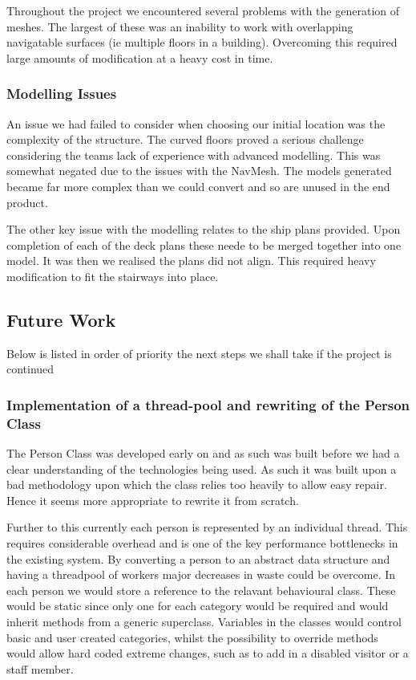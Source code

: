 Throughout the project we encountered several problems with the generation
of meshes. The largest of these was an inability to work with overlapping
navigatable surfaces (ie multiple floors in a building). Overcoming
this required large amounts of modification at a heavy cost in time.


\subsubsection*{Modelling Issues}

An issue we had failed to consider when choosing our initial location
was the complexity of the structure. The curved floors proved a serious
challenge considering the teams lack of experience with advanced modelling.
This was somewhat negated due to the issues with the NavMesh. The
models generated became far more complex than we could convert and
so are unused in the end product.

The other key issue with the modelling relates to the ship plans provided.
Upon completion of each of the deck plans these neede to be merged
together into one model. It was then we realised the plans did not
align. This required heavy modification to fit the stairways into
place.


\subsection{Future Work}

Below is listed in order of priority the next steps we shall take
if the project is continued


\subsubsection*{Implementation of a thread-pool and rewriting of the Person Class}

The Person Class was developed early on and as such was built before
we had a clear understanding of the technologies being used. As such
it was built upon a bad methodology upon which the class relies too
heavily to allow easy repair. Hence it seems more appropriate to rewrite
it from scratch.

Further to this currently each person is represented by an individual
thread. This requires considerable overhead and is one of the key
performance bottlenecks in the existing system. By converting a person
to an abstract data structure and having a threadpool of workers major
decreases in waste could be overcome. In each person we would store
a reference to the relavant behavioural class. These would be static
since only one for each category would be required and would inherit
methods from a generic superclass. Variables in the classes would
control basic and user created categories, whilst the possibility
to override methods would allow hard coded extreme changes, such as
to add in a disabled visitor or a staff member.

